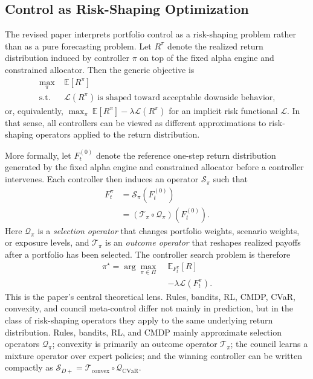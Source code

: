 \documentclass[10pt,twocolumn]{article}
\begin{document}
\subsection{Control as Risk-Shaping Optimization}

The revised paper interprets portfolio control as a risk-shaping problem rather
than as a pure forecasting problem. Let $R^\pi$ denote the realized return
distribution induced by controller $\pi$ on top of the fixed alpha engine and
constrained allocator. Then the generic objective is
\[
\begin{aligned}
\max_{\pi}\;& \mathbb{E}[R^\pi] \\
\text{s.t.}\;& \mathcal{L}(R^\pi)\ \text{is shaped toward acceptable downside behavior,}
\end{aligned}
\]
or, equivalently, $\max_{\pi}\ \mathbb{E}[R^\pi]-\lambda\mathcal{L}(R^\pi)$ for
an implicit risk functional $\mathcal{L}$. In that sense, all controllers can
be viewed as different approximations to risk-shaping operators applied to the
return distribution.

More formally, let $F_t^{(0)}$ denote the reference one-step return
distribution generated by the fixed alpha engine and constrained allocator
before a controller intervenes. Each controller then induces an operator
$\mathcal{S}_\pi$ such that
\[
\begin{aligned}
F_t^\pi
&= \mathcal{S}_\pi\!\left(F_t^{(0)}\right) \\
&= \left(\mathcal{T}_\pi \circ \mathcal{Q}_\pi\right)\!\left(F_t^{(0)}\right).
\end{aligned}
\]
Here $\mathcal{Q}_\pi$ is a \emph{selection operator} that changes portfolio
weights, scenario weights, or exposure levels, and $\mathcal{T}_\pi$ is an
\emph{outcome operator} that reshapes realized payoffs after a portfolio has
been selected. The controller search problem is therefore
\[
\begin{aligned}
\pi^\star
= \arg\max_{\pi \in \Pi}\;& \mathbb{E}_{F_t^\pi}[R] \\
&- \lambda \mathcal{L}(F_t^\pi).
\end{aligned}
\]
This is the paper's central theoretical lens. Rules, bandits, RL, CMDP, CVaR,
convexity, and council meta-control differ not mainly in prediction, but in the
class of risk-shaping operators they apply to the same underlying return
distribution. Rules, bandits, RL, and CMDP mainly approximate selection
operators $\mathcal{Q}_\pi$; convexity is primarily an outcome operator
$\mathcal{T}_\pi$; the council learns a mixture operator over expert policies;
and the winning controller can be written compactly as
$\mathcal{S}_{D+}=\mathcal{T}_{\text{convex}}\circ\mathcal{Q}_{\text{CVaR}}$.
\end{document}
